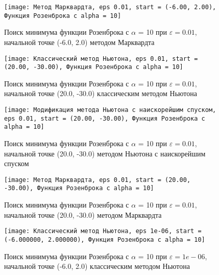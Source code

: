             \begin{figure}[H]
	        \centering
	        \texttt{[image: Метод Марквардта, eps 0.01, start = (-6.00, 2.00), Функция Розенброка с alpha = 10]}%
	        \caption{Поиск минимума функции Розенброка с $\alpha$ = 10 при $\varepsilon = 0.01$, начальной точке (-6.0, 2.0) методом Марквардта}
	        \vspace*{-1.2cm}
            \end{figure}
            
            \begin{figure}[H]
	        \centering
	        \texttt{[image: Классический метод Ньютона, eps 0.01, start = (20.00, -30.00), Функция Розенброка с alpha = 10]}%
	        \caption{Поиск минимума функции Розенброка с $\alpha$ = 10 при $\varepsilon = 0.01$, начальной точке (20.0, -30.0) классическим методом Ньютона}
	        \vspace*{-1.2cm}
            \end{figure}
            
            \begin{figure}[H]
	        \centering
	        \texttt{[image: Модификация метода Ньютона с наискорейшим спуском, eps 0.01, start = (20.00, -30.00), Функция Розенброка с alpha = 10]}%
	        \caption{Поиск минимума функции Розенброка с $\alpha$ = 10 при $\varepsilon = 0.01$, начальной точке (20.0, -30.0) методом Ньютона с наискорейшим спуском}
	        \vspace*{-1.2cm}
            \end{figure}
            
            \begin{figure}[H]
	        \centering
	        \texttt{[image: Метод Марквардта, eps 0.01, start = (20.00, -30.00), Функция Розенброка с alpha = 10]}%
	        \caption{Поиск минимума функции Розенброка с $\alpha$ = 10 при $\varepsilon = 0.01$, начальной точке (20.0, -30.0) методом Марквардта}
	        \vspace*{-1.2cm}
            \end{figure}
            
            \begin{figure}[H]
	        \centering
	        \texttt{[image: Классический метод Ньютона, eps 1e-06, start = (-6.000000, 2.000000), Функция Розенброка с alpha = 10]}%
	        \caption{Поиск минимума функции Розенброка с $\alpha$ = 10 при $\varepsilon = 1e-06$, начальной точке (-6.0, 2.0) классическим методом Ньютона}
	        \vspace*{-1.2cm}
            \end{figure}
            
